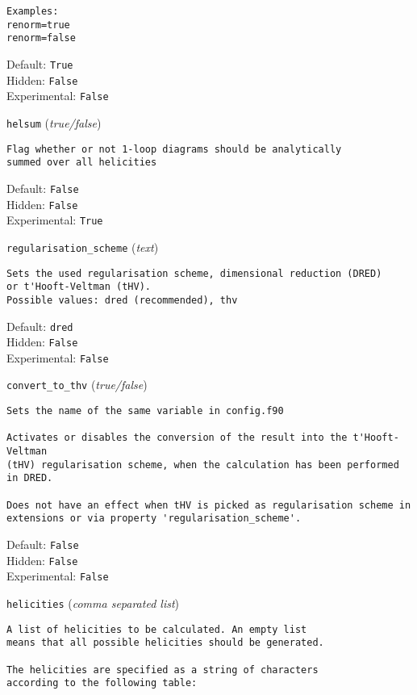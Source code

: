 \begin{basedescript}{\desclabelstyle{\pushlabel}}
\begin{verbatim}
Examples:
renorm=true
renorm=false
\end{verbatim}
Default: \verb|True|
\\Hidden: \verb|False|
\\Experimental: \verb|False|
\\\item[\colorbox{gray!30}{\texttt{helsum}}] (\textit{true/false})
\begin{verbatim}
Flag whether or not 1-loop diagrams should be analytically
summed over all helicities
\end{verbatim}
Default: \verb|False|
\\Hidden: \verb|False|
\\Experimental: \verb|True|
\\\item[\colorbox{gray!30}{\texttt{regularisation\_scheme}}] (\textit{text})
\begin{verbatim}
Sets the used regularisation scheme, dimensional reduction (DRED)
or t'Hooft-Veltman (tHV).
Possible values: dred (recommended), thv
\end{verbatim}
Default: \verb|dred|
\\Hidden: \verb|False|
\\Experimental: \verb|False|
\\\item[\colorbox{gray!30}{\texttt{convert\_to\_thv}}] (\textit{true/false})
\begin{verbatim}
Sets the name of the same variable in config.f90

Activates or disables the conversion of the result into the t'Hooft-Veltman
(tHV) regularisation scheme, when the calculation has been performed in DRED.

Does not have an effect when tHV is picked as regularisation scheme in
extensions or via property 'regularisation_scheme'.
\end{verbatim}
Default: \verb|False|
\\Hidden: \verb|False|
\\Experimental: \verb|False|
\\\item[\colorbox{gray!30}{\texttt{helicities}}] (\textit{comma separated list})
\begin{verbatim}
A list of helicities to be calculated. An empty list
means that all possible helicities should be generated.

The helicities are specified as a string of characters
according to the following table:


\end{verbatim}
\end{basedescript}
